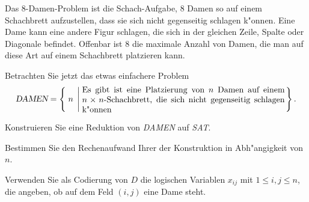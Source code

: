 Das 8-Damen-Problem ist die Schach-Aufgabe, 8 Damen so auf einem Schachbrett
aufzustellen, dass sie sich nicht gegenseitig schlagen k"onnen.
Eine Dame kann eine andere Figur schlagen, die sich in der gleichen Zeile,
Spalte oder Diagonale befindet.
Offenbar ist 8 die maximale Anzahl von Damen, die man auf diese Art auf
einem Schachbrett platzieren kann.

Betrachten Sie jetzt das etwas einfachere Problem
\[
\textsl{DAMEN}
=
\left\{\; n
\;\left|\;
\begin{minipage}{0.7\hsize}
Es gibt ist eine Platzierung von $n$ Damen auf einem $n\times n$-Schachbrett,
die sich nicht gegenseitig schlagen k"onnen
\end{minipage}\right.\right\}.
\]
\begin{teilaufgaben}
\item
Konstruieren Sie eine Reduktion von \textsl{DAMEN} auf \textsl{SAT}.
\item
Bestimmen Sie den Rechenaufwand Ihrer der Konstruktion in Abh"angigkeit von $n$.
\end{teilaufgaben}

\begin{hinweis}
Verwenden Sie als Codierung von $D$ die logischen Variablen $x_{ij}$
mit $1\le i,j\le n$, die angeben, ob auf dem Feld $(i,j)$ eine Dame
steht.
\end{hinweis}

